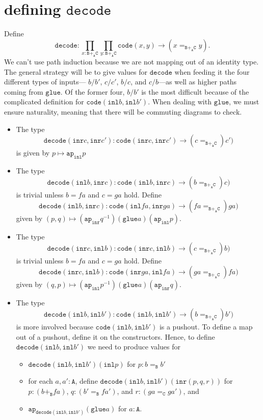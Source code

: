 \documentclass[12pt]{amsart}
\newcommand{\from}{\colon}
\newcommand{\type}[1]{\mathtt{#1}}
\newcommand{\A}{\type{A}}
\newcommand{\B}{\type{B}}
\newcommand{\C}{\type{C}}
\newcommand{\BAC}{\B +_{\A} \C}
\newcommand{\ap}{\type{ap}}
\newcommand{\inl}{\type{inl}}
\newcommand{\inr}{\type{inr}}
\newcommand{\glue}{\type{glue}}
\newcommand{\code}{\type{code}}
\newcommand{\decode}{\type{decode}}
\theoremstyle{remark}
\theoremstyle{definition}
\begin{document}
\pagebreak
\section{defining $\decode$}

Define 
\[ %
	\decode : 
	\prod_{x : \BAC} \prod_{y : \BAC} 
	\code (x,y) \to (x=_{\BAC} y).
\]
We can't use path induction because we are not mapping out of an
identity type. The general strategy will be to give values for $
\decode $ when feeding it the four different types of inputs--- $ b/b'
$, $ c/c' $, $ b/c $, and $ c/b $---as well as higher paths coming
from $ \glue $.  Of the former four, $ b/b' $ is the most difficult
because of the complicated definition for $ \code (\inl b , \inl b')
$.  When dealing with $ \glue $, we must ensure naturality, meaning
that there will be commuting diagrams to check.

\begin{itemize} 
	\item The type
	\[
		\decode ( \inr c , \inr c') \from 
		\code ( \inr c , \inr c' ) \to ( c =_{\B +_{\A} \C}) c' )
	\]
	is given by $ p \mapsto \ap_{\inl} p $
	\item The type 
	\[
		\decode ( \inl b , \inr c ) \from 
		\code ( \inl b , \inr c ) \to ( b =_{\B +_{\A} \C}) c )
	\]
	is trivial unless $ b = fa $ and $ c = ga $ hold. Define
	\[
		\decode ( \inl b , \inr c ) \from 
		\code ( \inl fa , \inr ga ) \to ( fa =_{\B +_{\A} \C}) ga )
	\]
	given by $ (p,q) \mapsto (\ap_{\inr} q^{-1}) (\glue a) (\ap_{\inl} p)$.
	\item The type 
	\[
		\decode ( \inr c , \inl b ) \from 
		\code ( \inr c , \inl b ) \to ( c =_{\B +_{\A} \C}) b )
	\]
	is trivial unless $ b = fa $ and $ c = ga $ hold. Define
	\[
		\decode ( \inr c , \inl b ) \from 
		\code ( \inr ga , \inl fa ) \to ( ga =_{\B +_{\A} \C}) fa )
	\]
	given by $ (q,p) \mapsto (\ap_{\inl} p^{-1}) (\glue a) (\ap_{\inr} q) $.
	\item The type 
	\[
		\decode ( \inl b , \inl b' ) \from 
		\code ( \inl b , \inl b' ) \to ( b =_{\B +_{\A} \C}) b' )
	\]
	is more involved because $ \code ( \inl b , \inl b' ) $ is a pushout.  To define a map out of a pushout, define it on the constructors.  Hence, to define $ \decode ( \inl b , \inl b' ) $ we need to produce values for
	\begin{itemize}
		\item $ \decode ( \inl b , \inl b' ) (\inl p) $ for $ p : b =_{\B} b' $
		\item for each $ a,a' : \A $, define $ \decode ( \inl b , \inl b' ) (\inr (p,q,r)) $ for $ p : (b +_{\B} fa) $, $ q : (b' =_{\B} fa') $, and $ r : (ga =_{\C} ga') $, and
		\item $ \ap_{\decode ( \inl b , \inl b' )} (\glue a)  $ for $ a : \A $.
	\end{itemize}
\end{itemize}
\end{document}
